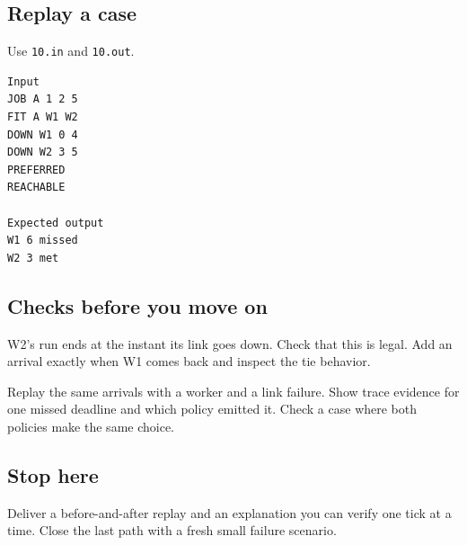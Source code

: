 \documentclass[11pt,letterpaper]{article}
\begin{document}
\subsection*{Replay a case}

Use \texttt{10.in} and \texttt{10.out}.

\begin{samepage}
\small
\begin{verbatim}
Input
JOB A 1 2 5
FIT A W1 W2
DOWN W1 0 4
DOWN W2 3 5
PREFERRED
REACHABLE

Expected output
W1 6 missed
W2 3 met
\end{verbatim}
\end{samepage}

\subsection*{Checks before you move on}

W2's run ends at the instant its link goes down. Check that this is legal. Add an arrival exactly when W1 comes back and inspect the tie behavior.

Replay the same arrivals with a worker and a link failure. Show trace evidence for one missed deadline and which policy emitted it. Check a case where both policies make the same choice.

\subsection*{Stop here}

Deliver a before-and-after replay and an explanation you can verify one tick at a time. Close the last path with a fresh small failure scenario.
\end{document}
